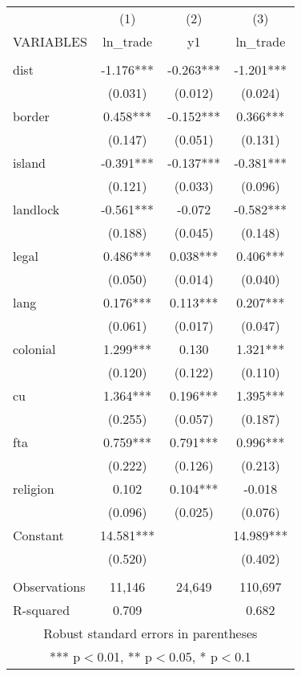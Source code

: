 \documentclass[]{article}
\begin{document}
\begin{tabular}{lccc} \hline
 & (1) & (2) & (3) \\
VARIABLES & ln\_trade & y1 & ln\_trade \\ \hline
 &  &  &  \\
dist & -1.176*** & -0.263*** & -1.201*** \\
 & (0.031) & (0.012) & (0.024) \\
border & 0.458*** & -0.152*** & 0.366*** \\
 & (0.147) & (0.051) & (0.131) \\
island & -0.391*** & -0.137*** & -0.381*** \\
 & (0.121) & (0.033) & (0.096) \\
landlock & -0.561*** & -0.072 & -0.582*** \\
 & (0.188) & (0.045) & (0.148) \\
legal & 0.486*** & 0.038*** & 0.406*** \\
 & (0.050) & (0.014) & (0.040) \\
lang & 0.176*** & 0.113*** & 0.207*** \\
 & (0.061) & (0.017) & (0.047) \\
colonial & 1.299*** & 0.130 & 1.321*** \\
 & (0.120) & (0.122) & (0.110) \\
cu & 1.364*** & 0.196*** & 1.395*** \\
 & (0.255) & (0.057) & (0.187) \\
fta & 0.759*** & 0.791*** & 0.996*** \\
 & (0.222) & (0.126) & (0.213) \\
religion & 0.102 & 0.104*** & -0.018 \\
 & (0.096) & (0.025) & (0.076) \\
Constant & 14.581*** &  & 14.989*** \\
 & (0.520) &  & (0.402) \\
 &  &  &  \\
Observations & 11,146 & 24,649 & 110,697 \\
 R-squared & 0.709 &  & 0.682 \\ \hline
\multicolumn{4}{c}{ Robust standard errors in parentheses} \\
\multicolumn{4}{c}{ *** p$<$0.01, ** p$<$0.05, * p$<$0.1} \\
\end{tabular}
\end{document}
